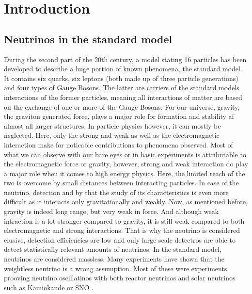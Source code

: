 
\chapter{Introduction}
\label{ch:Introduction}
    \section{Neutrinos in the standard model}
    \label{ch:Introduction:sec:Neutrinos in the standard model}
    During the second part of the 20th century, a model stating 16 particles has been developed to describe a huge portion of known phenomena, the standard model. It contains six quarks, six leptons (both made up of three particle generations) and four types of Gauge Bosons. The latter are carriers of the standard models interactions of the former particles, meaning all interactions of matter are based on the exchange of one or more of the Gauge Bosons. 
    For our universe, gravity, the graviton generated force, plays a major role for formation and stability af almost all larger structures. In particle physics however, it can mostly be neglected. Here, only the strong and weak as well as the electromagnetic interaction make for noticable contributions to phenomena observed.
    Most of what we can observe with our bare eyes or in basic experiments is attributable to the electromagnetic force or gravity, however, strong and weak interaction do play a major role when it comes to high energy physics. Here, the limited reach of the two is overcome by small distances between interacting particles. In case of the neutrino, detection and by that the study of its characteristics is even more difficult as it interacts only gravitationally and weakly. Now, as mentioned before, gravity is indeed long range, but very weak in force. And although weak intraction is a lot stronger compared to gravity, it is still weak compared to both electromagnetic and strong interactions. That is why the neutrino is considered elusive, detection efficiencies are low and only large scale detectros are able to detect statistically relevant amounts of neutrinos.
    In the standard model, neutrinos are considered massless. 
    Many experiments have shown that the weightless neutrino is a wrong assumption. Most of these were experiments prooving neutrino oscillatinos with both reactor neutrinos and solar neutrinos such as Kamiokande\cite{PhysRevLett.110.181802} or SNO \cite{SNOOscillations} .
    
